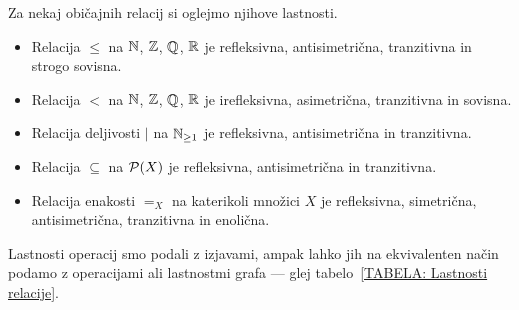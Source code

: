                 \begin{zgled}
                        Za nekaj običajnih relacij si oglejmo njihove lastnosti.
                        \begin{itemize}
                                \item
                                        Relacija $\leq$ na $\mathbb{N}$, $\mathbb{Z}$, $\mathbb{Q}$, $\mathbb{R}$ je refleksivna, antisimetrična, tranzitivna in strogo sovisna.
                                \item
                                        Relacija $<$ na $\mathbb{N}$, $\mathbb{Z}$, $\mathbb{Q}$, $\mathbb{R}$ je irefleksivna, asimetrična, tranzitivna in sovisna.
                                \item
                                        Relacija deljivosti $|$ na $\mathbb{N}_{\geq 1}$ je refleksivna, antisimetrična in tranzitivna.
                                \item
                                        Relacija $\subseteq$ na $\mathcal{P}(X)$ je refleksivna, antisimetrična in tranzitivna.
                                \item
                                        Relacija enakosti $=_X$ na katerikoli množici $X$ je refleksivna, simetrična, antisimetrična, tranzitivna in enolična.
                        \end{itemize}
                \end{zgled}

                Lastnosti operacij smo podali z izjavami, ampak lahko jih na ekvivalenten način podamo z operacijami ali lastnostmi grafa --- glej tabelo~\ref{TABELA: Lastnosti relacije}.


